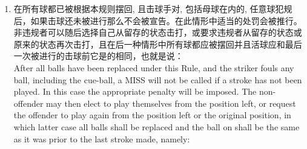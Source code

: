 \begin{enumerate}[label=(\alph*)]
    \begin{enumerate}[label=(\roman*)]
        \item \label{22314di}在从原来的状态进行的一次击球时的第二次首先击中活球的失败应被无视分差地宣告“犯规且\miss{}”；\\
        a second failure to first hit a ball on in making a stroke from the original position shall be called as a FOUL AND A MISS regardless of the difference in scores;
        \item \label{22314dii}如果是如上面\ref{22314di}中[所述]的第二次失败，那么若被要求从原来的状态再次击打，则违规者应被裁判警告接下来的失败会导致此局被判定他们的对方赢得。然而，如果警告未被宣布那么一局不能被判定赢得。如果裁判未宣布警告，那么只要“犯规且\miss{}”的宣告序列已继续，击球手就会在首个可行的机会被警告；\\
        in the event of a second failure as in \ref{22314di} above, if asked to play again from the original position, the offender shall be Warned by the referee that a further failure will result in the frame being awarded to their opponent. However, a frame cannot be awarded if a Warning has not been issued. If the referee has not issued the Warning, provided the sequence of FOUL AND A MISS calls has continued, the striker will be Warned at the first available opportunity;
        \item 如果被要求从留存的状态击打，那么如\ref{22314d}\ref{22314di}和\ref{22314d} \ref{22314dii}中[所述]的“犯规且\miss{}”序列终止。\\
        if asked to play from the position left, the Foul and a Miss sequence as in \ref{22314d}\ref{22314di} and \ref{22314d}\ref{22314dii} ends.
    \end{enumerate}
    \item \label{22314e}在所有球都已被根据本规则摆回, 且击球手对, 包括母球在内的, 任意球犯规后，如果击球还未被进行那么\miss{}不会被宣告。在此情形中适当的处罚会被推行。非违规者可以随后选择自己从留存的状态击打，或要求违规者从留存的状态或原来的状态再次击打，且在后一种情形中所有球都应被摆回并且活球应和最后一次被进行的击球前它是的相同，也就是说：\\
    After all balls have been replaced under this Rule, and the striker fouls any ball, including the cue-ball, a MISS will not be called if a stroke has not been played. In this case the appropriate penalty will be imposed. The non-offender may then elect to play themselves from the position left, or request the offender to play again from the position left or the original position, in which latter case all balls shall be replaced and the ball on shall be the same as it was prior to the last stroke made, namely:

\end{enumerate}
